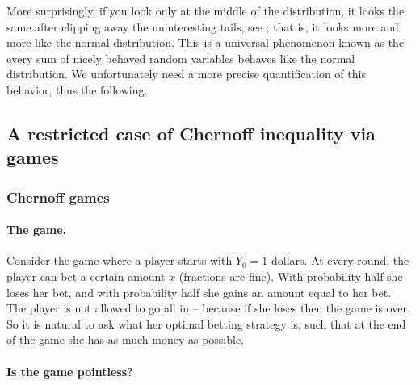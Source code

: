 More surprisingly, if you look only at the middle of the distribution,
it looks the same after clipping away the uninteresting tails, see
; that is, it looks more and more
like the normal distribution. This is a universal phenomenon known as the
 -- every sum of nicely behaved random
variables behaves like the normal distribution. We unfortunately need
a more precise quantification of this behavior, thus the following.








\subsection{A restricted case of Chernoff inequality via %
   games}
\subsubsection{Chernoff games}

\paragraph*{The game.}

Consider the game where a player starts with $Y_0=1$ dollars. At every
round, the player can bet a certain amount $x$ (fractions are
fine). With probability half she loses her bet, and with probability
half she gains an amount equal to her bet.  The player is not allowed
to go all in -- because if she loses then the game is over. So it is
natural to ask what her optimal betting strategy is, such that at the
end of the game she has as much money as possible.


\paragraph*{Is the game pointless?}

